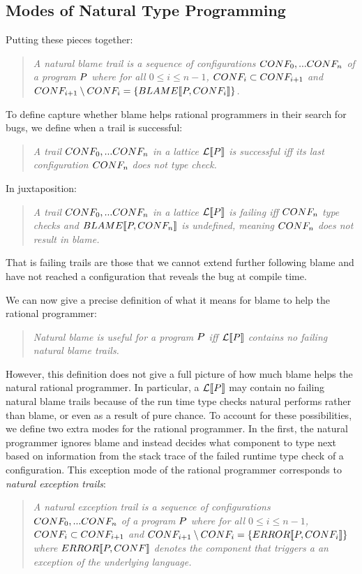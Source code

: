 \subsection{Modes of Natural Type Programming} \label{sub:natural}

Putting these pieces together:

\begin{quote}
\it 
A natural blame trail
is a sequence of configurations $CONF_0,...CONF_n$ of a program
$P$ where for all $0 \leq i \leq n - 1$, $CONF_i \subset CONF_{i+1}$ and
$CONF_{i+1} \setminus CONF_i = \{BLAME\llbracket P, CONF_i\rrbracket\}$.
\end{quote}

To define capture whether blame helps rational
programmers in their search for bugs, we define when a trail is successful:
\begin{quote}
\it 
A trail $CONF_0,...CONF_n$ in a lattice $\mathcal{L}\llbracket P\rrbracket$ is
\emph{successful}  iff its last configuration $CONF_n$ does not type check.
  \end{quote}
  In juxtaposition:
\begin{quote}
\it 
A trail $CONF_0,...CONF_n$ in a lattice $\mathcal{L}\llbracket P\rrbracket$ is
\emph{failing}  iff $CONF_n$ type checks and $BLAME\llbracket P,CONF_n\rrbracket$ is
undefined, meaning $CONF_n$ does not result in blame. 
 \end{quote}
That is failing trails are those that we cannot extend
further following blame and have not reached a configuration that reveals
the bug at
compile time.

 We can now give a precise definition of what it
means for blame to help the rational programmer:
\begin{quote}
\it
  Natural blame is useful for a program $P$ iff 
  $\mathcal{L}\llbracket P\rrbracket$ contains no failing natural blame trails.
\end{quote}


However, this definition does not give a full picture of how much blame helps the
natural rational programmer. In particular,  a $\mathcal{L}\llbracket P\rrbracket$
may contain no failing natural blame trails because
of the run time type checks natural performs rather than blame, or even as a result
of pure chance. To account for these possibilities, we define two extra
modes for the rational programmer. In the first, the natural programmer
ignores blame and instead decides what component to type next based on
information from the stack trace of the failed runtime type check of a
configuration.  This exception mode of the rational programmer corresponds to \emph{natural
exception trails}:
\begin{quote}
\it 
A natural exception trail
is a sequence of configurations $CONF_0,...CONF_n$ of a program
$P$ where for all $0 \leq i \leq n - 1$, $CONF_i \subset CONF_{i+1}$ and
$CONF_{i+1} \setminus CONF_i = \{ERROR\llbracket P, CONF_i\rrbracket\}$
  where $ERROR\llbracket P, CONF\rrbracket$ denotes the component that triggers a
an exception of the underlying language.
\end{quote}


